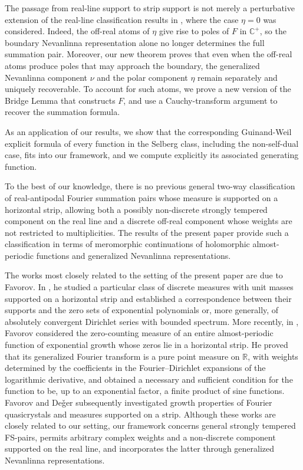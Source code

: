 \documentclass[a4paper,reqno,12pt]{amsart}
\renewcommand{\r}{\mathbb{R}}
\newcommand{\cp}{\mathbb{C}} %
\newcommand{\1}{{\bf 1}}
\begin{document}
The passage from real-line support to strip support is not merely a perturbative extension of the real-line classification results in \cite{G23,GV}, where the case $\eta=0$ was considered. Indeed, the off-real atoms of $\eta$ give rise to poles of $F$ in $\cp^+$, so the boundary Nevanlinna representation alone no longer determines the full summation pair. Moreover, our new theorem proves that even when the off-real atoms produce poles that may approach the boundary, the generalized Nevanlinna component $\nu$ and the polar component $\eta$ remain separately and uniquely recoverable. To account for such atoms, we prove a new version of the Bridge Lemma that constructs $F$, and use a Cauchy-transform argument to recover the summation formula.

As an application of our results, we show that the corresponding Guinand-Weil explicit formula of every function in the Selberg class, including the non-self-dual case, fits into our framework, and we compute explicitly its associated generating function.

To the best of our knowledge, there is no previous general two-way classification of real-antipodal Fourier summation pairs whose measure is supported on a horizontal strip, allowing both a possibly non-discrete strongly tempered component on the real line and a discrete off-real component whose weights are not restricted to multiplicities. The results of the present paper provide such a classification in terms of meromorphic continuations of holomorphic almost-periodic functions and generalized Nevanlinna representations.

The works most closely related to the setting of the present paper are due to Favorov. In \cite{Fstrip}, he studied a particular class of discrete measures with unit masses supported on a horizontal strip and established a correspondence between their supports and the zero sets of exponential polynomials or, more generally, of absolutely convergent Dirichlet series with bounded spectrum. More recently, in \cite{FEntire}, Favorov considered the zero-counting measure of an entire almost-periodic function of exponential growth whose zeros lie in a horizontal strip. He proved that its generalized Fourier transform is a pure point measure on $\r$, with weights determined by the coefficients in the Fourier--Dirichlet expansions of the logarithmic derivative, and obtained a necessary and sufficient condition for the function to be, up to an exponential factor, a finite product of sine functions. Favorov and De\v{g}er \cite{FD} subsequently investigated growth properties of Fourier quasicrystals and measures supported on a strip. Although these works are closely related to our setting, our framework concerns general strongly tempered FS-pairs, permits arbitrary complex weights and a non-discrete component supported on the real line, and incorporates the latter through generalized Nevanlinna representations.
\end{document}
